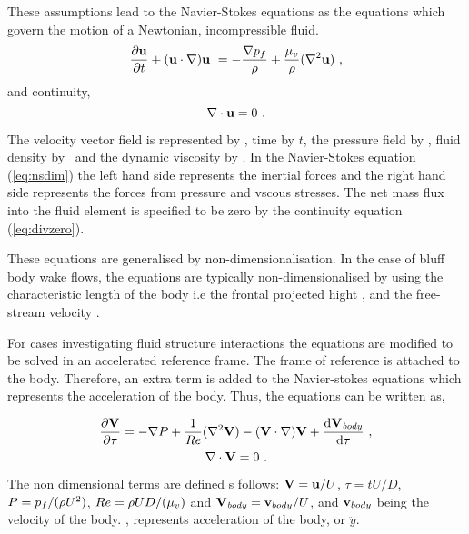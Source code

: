 These assumptions lead to the Navier-Stokes equations as the equations which govern the motion of a Newtonian, incompressible fluid.
  \begin{equation} \centering
  \label{eq:nsdim}
  \pderiv{\vecu}{t} + (\vecu\cdot\nabla)\vecu\ = -\frac{\grad{\pres}}{\density} + \frac{\dynvis}{\density}(\gradsq{\vecu})~,
  \end{equation}
  and continuity,
  \begin{equation} \centering
    \label{eq:divzero}
  \divergence{\vecu} = 0~.
  \end{equation}
  
  The velocity vector field is represented by \vecu, time by $t$, the pressure field by \pres, fluid density by \density\ and the dynamic viscosity by \dynvis. In the Navier-Stokes equation (\ref{eq:nsdim}) the left hand side represents the inertial forces and the right hand side represents the forces from  pressure and vscous stresses. The net mass flux into the fluid element is specified to be zero by the continuity equation (\ref{eq:divzero}). 
  
  These equations are generalised by non-dimensionalisation. In the case of bluff body wake flows, the equations are typically non-dimensionalised by using the characteristic length of the body i.e the frontal projected hight \diam, and the free-stream velocity \Ufree. 
  
  For cases investigating fluid structure interactions the equations are modified  to  be solved in an accelerated reference frame. The frame of reference is attached to the body. Therefore, an extra term is added to the Navier-stokes equations which represents the acceleration of the body. Thus, the equations can be written as, 
  
  \begin{equation} \centering
  \label{eq:nsfinal}
  \pderiv{\vecV}{\tau} = -\grad{\Pres} + \frac{1}{\reynoldsnumber}(\gradsq{\vecV}) - (\vecV\cdot\nabla)\vecV + \accframe ~,
  \end{equation}
  \begin{equation}
  \label{eq:continuity}
  \nabla\cdot\mathbf{V} = 0~.
  \end{equation}
  
   The non dimensional terms are defined s follows: $\mathbf{V} = \mathbf{u}/U$, $\tau = tU/D$, $P = p_{f}/(\rho
  U^{2})$, $Re = \rho UD/(\mu_{v})$ and $\mathbf{V}_{\mathit{body}} = \mathbf{v}_{body}/U$, and 
  $\mathbf{v}_{body}$ being the velocity of the body. \accframe, represents acceleration of the body, or $\ddot{y}$.
  
